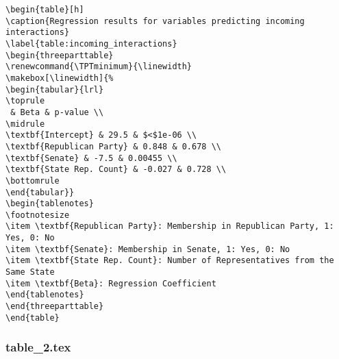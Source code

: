 \documentclass[11pt]{article}
\begin{document}
\begin{Verbatim}[tabsize=4]
\begin{table}[h]
\caption{Regression results for variables predicting incoming interactions}
\label{table:incoming_interactions}
\begin{threeparttable}
\renewcommand{\TPTminimum}{\linewidth}
\makebox[\linewidth]{%
\begin{tabular}{lrl}
\toprule
 & Beta & p-value \\
\midrule
\textbf{Intercept} & 29.5 & $<$1e-06 \\
\textbf{Republican Party} & 0.848 & 0.678 \\
\textbf{Senate} & -7.5 & 0.00455 \\
\textbf{State Rep. Count} & -0.027 & 0.728 \\
\bottomrule
\end{tabular}}
\begin{tablenotes}
\footnotesize
\item \textbf{Republican Party}: Membership in Republican Party, 1: Yes, 0: No
\item \textbf{Senate}: Membership in Senate, 1: Yes, 0: No
\item \textbf{State Rep. Count}: Number of Representatives from the Same State
\item \textbf{Beta}: Regression Coefficient
\end{tablenotes}
\end{threeparttable}
\end{table}

\end{Verbatim}

\subsubsection*{table\_2.tex}
\end{document}
